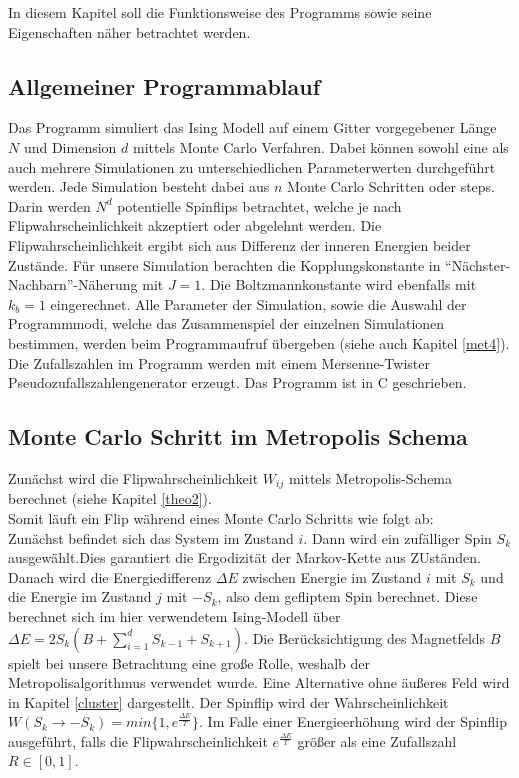 
In diesem Kapitel soll die Funktionsweise des Programms sowie seine Eigenschaften näher betrachtet werden.


\subsection{Allgemeiner Programmablauf}

Das Programm simuliert das Ising Modell auf einem Gitter vorgegebener Länge $N$ und Dimension $d$ mittels Monte Carlo Verfahren. Dabei können sowohl eine als auch mehrere Simulationen zu unterschiedlichen Parameterwerten durchgeführt werden. Jede Simulation besteht dabei aus $n$ Monte Carlo Schritten oder steps. Darin werden $N^{d}$ potentielle Spinflips betrachtet, welche je nach Flipwahrscheinlichkeit akzeptiert oder abgelehnt werden. Die Flipwahrscheinlichkeit ergibt sich aus Differenz der inneren Energien beider Zustände. Für unsere Simulation berachten die Kopplungskonstante in “Nächster-Nachbarn”-Näherung mit $J=1$. Die Boltzmannkonstante wird ebenfalls mit $k_{b}=1$ eingerechnet. 
Alle Parameter der Simulation, sowie die Auswahl der Programmmodi, welche das Zusammenspiel der einzelnen Simulationen bestimmen, werden beim Programmaufruf übergeben (siehe auch Kapitel \ref{met4}). Die Zufallszahlen im Programm werden mit einem Mersenne-Twister Pseudozufallszahlengenerator erzeugt. Das Programm ist in C geschrieben.


\subsection{Monte Carlo Schritt im Metropolis Schema}

Zunächst wird die Flipwahrscheinlichkeit $W_{ij}$ mittels Metropolis-Schema berechnet (siehe Kapitel \ref{theo2}).\\
Somit läuft ein Flip während eines Monte Carlo Schritts wie folgt ab:\\
Zunächst befindet sich das System im Zustand $i$. Dann wird ein zufälliger Spin $S_{k}$ ausgewählt.Dies garantiert die Ergodizität der Markov-Kette aus ZUständen. Danach wird die Energiedifferenz $\Delta E$ zwischen Energie im Zustand $i$ mit $S_{k}$ und die Energie im Zustand $j$ mit $-S_{k}$, also dem gefliptem Spin berechnet. Diese berechnet sich im hier verwendetem Ising-Modell über $\Delta E=2S_{k}(B+\sum_{i=1}^{d}S_{k-1}+S_{k+1})$. Die Berücksichtigung des Magnetfelds $B$ spielt bei unsere Betrachtung eine große Rolle, weshalb der Metropolisalgorithmus verwendet wurde. Eine Alternative ohne äußeres Feld wird in Kapitel \ref{cluster} dargestellt. Der Spinflip wird der Wahrscheinlichkeit $W(S_k \rightarrow -S_k)=min\{ 1, e^{\frac{\Delta E}{T}} \}$. Im Falle einer Energieerhöhung wird der Spinflip ausgeführt, falls die Flipwahrscheinlichkeit $e^{\frac{\Delta E}{T}}$ größer als eine Zufallszahl $R\in[0,1]$.


